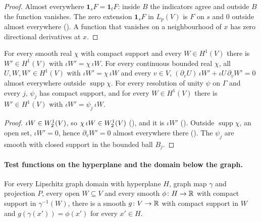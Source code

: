 \begin{proof}
\leanok
Almost everywhere $\mathbf 1_s F = \mathbf 1_t F$: inside $B$ the indicators agree and outside
$B$ the function vanishes. The zero extension $\mathbf 1_s F$ in $L_p(V)$ is $F$ on $s$ and $0$
outside almost everywhere (). A function that vanishes on a neighbourhood
of $x$ has zero directional derivatives at $x$.
\end{proof}

\begin{lemma}
\label{lem:sobolev-one-products}
\leanok
{}
For every smooth real $\chi$ with compact support and every $W \in H^1(V)$ there is
$W' \in H^1(V)$ with $\iota W' = \chi \, \iota W$. For every continuous bounded real $\chi$, all
$U, W, W' \in H^1(V)$ with $\iota W' = \chi \, \iota W$ and every $v \in V$,
$(\partial_v U) \, \iota W' + \iota U \, \partial_v W' = 0$ almost everywhere outside
$\operatorname{supp} \chi$. For every resolution of unity $\psi$ on $\Gamma$ and every $j$,
$\psi_j$ has compact support, and for every $W \in H^1(V)$ there is $W' \in H^1(V)$ with
$\iota W' = \psi_j \, \iota W$.
\end{lemma}

\begin{proof}
\leanok
$\iota W \in W^{1}_{2}(V)$, so $\chi \, \iota W \in W^{1}_{2}(V)$ (),
and it is $\iota W'$ (). Outside
$\operatorname{supp} \chi$, an open set,
$\iota W' = 0$, hence $\partial_v W' = 0$ almost everywhere there
(). The $\psi_j$ are smooth with closed support in
the bounded ball $B_j$.
\end{proof}

\paragraph{Test functions on the hyperplane and the domain below the graph.}

\begin{lemma}
\label{lem:hyperplane-test-restriction}
\leanok
{}
For every Lipschitz graph domain with hyperplane $H$, graph map $\gamma$ and projection $P$, every
open $W \subseteq V$ and every smooth $\phi \colon H \to \mathbb{R}$ with compact support in
$\gamma^{-1}(W)$, there is a smooth $g \colon V \to \mathbb{R}$ with compact support in $W$ and
$g(\gamma(x')) = \phi(x')$ for every $x' \in H$.
\end{lemma}

